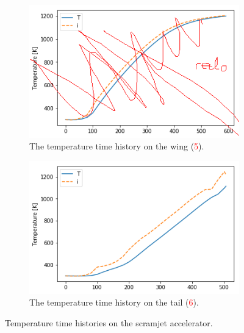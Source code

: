 \begin{figure}[ht]
\begin{subfigure}{.5\textwidth}
		\end{subfigure}
			\begin{subfigure}{.5\textwidth}
				\centering
				\includegraphics[width=0.99\linewidth]{figures/A1_uncertainty-analysis/TPos3png}
				\caption{The temperature time history on the wing (\textcolor{red}{5}).}
				
			\end{subfigure}
				\begin{subfigure}{.5\textwidth}
					\centering
					\includegraphics[width=0.99\linewidth]{figures/A1_uncertainty-analysis/TPos4png}
					\caption{The temperature time history on the tail (\textcolor{red}{6}).}
					
				\end{subfigure}
	\caption{Temperature time histories on the scramjet accelerator.}
	\label{fig:TrajTemp}
\end{figure}

